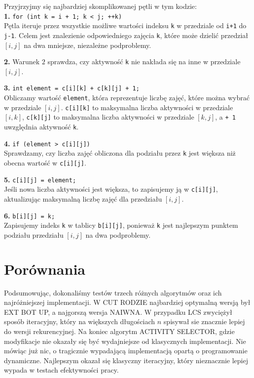 \documentclass{article}
\begin{document}
\large{Przyjrzyjmy się najbardziej skomplikowanej pętli w tym kodzie:}
\\

\textbf{1.} \texttt{for (int k = i + 1; k < j; ++k)} \\
Pętla iteruje przez wszystkie możliwe wartości indeksu \texttt{k} w przedziale od \texttt{i+1} do \texttt{j-1}. Celem jest znalezienie odpowiedniego zajęcia \texttt{k}, które może dzielić przedział \([i, j]\) na dwa mniejsze, niezależne podproblemy.

\bigskip

\textbf{2.} 
Warunek $2$ sprawdza, czy aktywność \texttt{k} nie nakłada się na inne w przedziale \([i, j]\). 
\bigskip

\textbf{3.} \texttt{int element = c[i][k] + c[k][j] + 1;} \\
Obliczamy wartość \texttt{element}, która reprezentuje liczbę zajęć, które można wybrać w przedziale \([i, j]\). \texttt{c[i][k]} to maksymalna liczba aktywności w przedziale \([i, k]\), \texttt{c[k][j]} to maksymalna liczba aktywności w przedziale \([k, j]\), a \texttt{+ 1} uwzględnia aktywność \texttt{k}.

\bigskip

\textbf{4.} \texttt{if (element > c[i][j])} \\
Sprawdzamy, czy liczba zajęć obliczona dla podziału przez \texttt{k} jest większa niż obecna wartość w \texttt{c[i][j]}.

\bigskip

\textbf{5.} \texttt{c[i][j] = element;} \\
Jeśli nowa liczba aktywności jest większa, to zapisujemy ją w \texttt{c[i][j]}, aktualizując maksymalną liczbę zajęć dla przedziału \([i, j]\).

\bigskip

\textbf{6.} \texttt{b[i][j] = k;} \\
Zapisujemy indeks \texttt{k} w tablicy \texttt{b[i][j]}, ponieważ \texttt{k} jest najlepszym punktem podziału przedziału \([i, j]\) na dwa podproblemy.


\section{Porównania}

\large{Podsumowując, dokonaliśmy testów trzech różnych algorytmów oraz ich najróżniejszej implementacji. W CUT RODZIE najbardziej optymalną wersją był EXT BOT UP, a najgorszą wersja NAIWNA. W przypadku LCS zwyciężył sposób iteracyjny, który na większych długościach $n$ spisywał sie znacznie lepiej do wersji rekurencyjnej. Na koniec algorytm ACTIVITY SELECTOR, gdzie modyfikacje nie okazały się być wydajniejsze od klasycznych implementacji. Nie mówiąc już nic, o tragicznie wypadającą implementacją opartą o programowanie dynamiczne. Najlepszym okazał się klasyczny iteracyjny, który nieznacznie lepiej wypada w testach efektywności pracy. }
\end{document}
